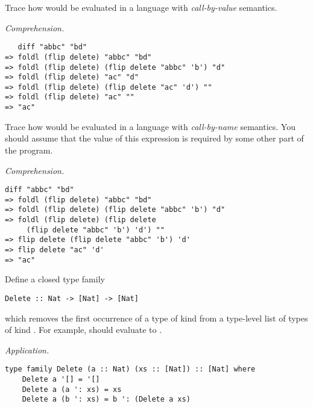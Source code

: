 \begin{parts}
\begin{subparts}
\subpart[4] \label{part:strict} Trace how  would be evaluated in a language with \emph{call-by-value} semantics. \droppoints
\begin{solution}
\emph{Comprehension.}
\begin{small}
\begin{verbatim}
   diff "abbc" "bd"
=> foldl (flip delete) "abbc" "bd"
=> foldl (flip delete) (flip delete "abbc" 'b') "d"
=> foldl (flip delete) "ac" "d"
=> foldl (flip delete) (flip delete "ac" 'd') ""
=> foldl (flip delete) "ac" ""
=> "ac"
\end{verbatim}
\end{small}
\end{solution}

\subpart[4] \label{part:lazy} Trace how  would be evaluated in a language with \emph{call-by-name} semantics. You should assume that the value of this expression is required by some other part of the program. \droppoints
\begin{solution} \emph{Comprehension.}
\begin{small}
\begin{verbatim}
diff "abbc" "bd"
=> foldl (flip delete) "abbc" "bd"
=> foldl (flip delete) (flip delete "abbc" 'b') "d"
=> foldl (flip delete) (flip delete 
     (flip delete "abbc" 'b') 'd') ""
=> flip delete (flip delete "abbc" 'b') 'd'
=> flip delete "ac" 'd'
=> "ac"
\end{verbatim}
\end{small}
\end{solution}

\subpart[4] Define a closed type family
\vspace*{0.2cm}
\begin{verbatim}
Delete :: Nat -> [Nat] -> [Nat]
\end{verbatim}
\vspace*{0.2cm}
which removes the first occurrence of a type of kind  from a type-level list of types of kind . For example,  should evaluate to . \droppoints
\begin{solution} \emph{Application.}
\begin{verbatim}
type family Delete (a :: Nat) (xs :: [Nat]) :: [Nat] where
    Delete a '[] = '[]
    Delete a (a ': xs) = xs
    Delete a (b ': xs) = b ': (Delete a xs)
\end{verbatim}
\end{solution}
\end{subparts}
\end{parts}
